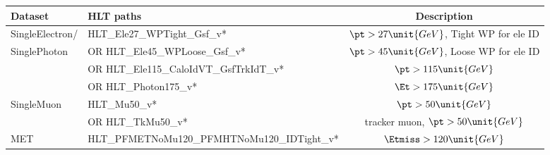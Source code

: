 \scriptsize
\begin{tabular}{l|l|c}
  \hline
  Dataset        & HLT paths                                    & Description\\
  \hline \hline
  \ttfamily SingleElectron/& \ttfamily HLT\_Ele27\_WPTight\_Gsf\_v*                 & $\pt>27\unit{GeV}$, Tight WP for ele ID  \\
  \ttfamily SinglePhoton   & \ttfamily OR HLT\_Ele45\_WPLoose\_Gsf\_v*              & $\pt>45\unit{GeV}$, Loose WP for ele ID  \\
                 & \ttfamily OR HLT\_Ele115\_CaloIdVT\_GsfTrkIdT\_v*      & $\pt>115\unit{GeV}$  \\
                 & \ttfamily OR HLT\_Photon175\_v*                        & $\Et>175\unit{GeV}$  \\
  \hline
  \ttfamily SingleMuon     & \ttfamily HLT\_Mu50\_v*                                & $\pt>50\unit{GeV}$ \\
                 & \ttfamily OR HLT\_TkMu50\_v*                           & tracker muon, $\pt>50\unit{GeV}$ \\
  \hline
  \ttfamily MET            & \ttfamily HLT\_PFMETNoMu120\_PFMHTNoMu120\_IDTight\_v* & $\Etmiss>120\unit{GeV}$ \\
  \hline
\end{tabular}
